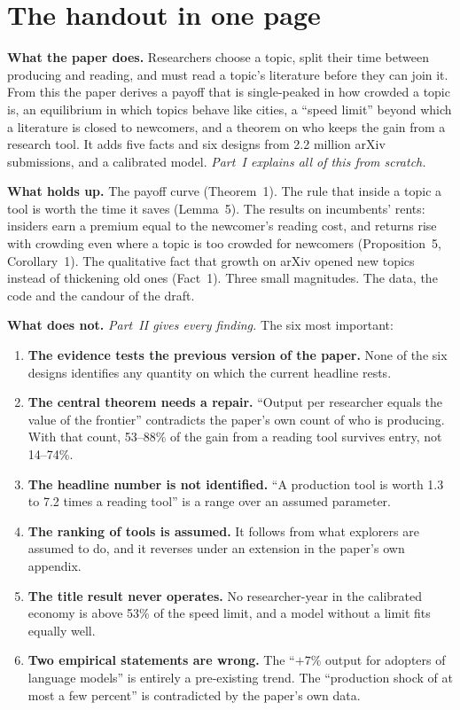 \section*{The handout in one page}

\textbf{What the paper does.} Researchers choose a topic, split their time between producing and reading, and must read a topic's literature before they can join it. From this the paper derives a payoff that is single-peaked in how crowded a topic is, an equilibrium in which topics behave like cities, a ``speed limit'' beyond which a literature is closed to newcomers, and a theorem on who keeps the gain from a research tool. It adds five facts and six designs from 2.2 million arXiv submissions, and a calibrated model. \emph{Part~I explains all of this from scratch.}

\textbf{What holds up.} The payoff curve (Theorem~1). The rule that inside a topic a tool is worth the time it saves (Lemma~5). The results on incumbents' rents: insiders earn a premium equal to the newcomer's reading cost, and returns rise with crowding even where a topic is too crowded for newcomers (Proposition~5, Corollary~1). The qualitative fact that growth on arXiv opened new topics instead of thickening old ones (Fact~1). Three small magnitudes. The data, the code and the candour of the draft.

\textbf{What does not.} \emph{Part~II gives every finding.} The six most important:
\begin{enumerate}[leftmargin=1.7em]
\item \textbf{The evidence tests the previous version of the paper.} None of the six designs identifies any quantity on which the current headline rests.
\item \textbf{The central theorem needs a repair.} ``Output per researcher equals the value of the frontier'' contradicts the paper's own count of who is producing. With that count, 53--88\% of the gain from a reading tool survives entry, not 14--74\%.
\item \textbf{The headline number is not identified.} ``A production tool is worth 1.3 to 7.2 times a reading tool'' is a range over an assumed parameter.
\item \textbf{The ranking of tools is assumed.} It follows from what explorers are assumed to do, and it reverses under an extension in the paper's own appendix.
\item \textbf{The title result never operates.} No researcher-year in the calibrated economy is above 53\% of the speed limit, and a model without a limit fits equally well.
\item \textbf{Two empirical statements are wrong.} The ``$+7\%$ output for adopters of language models'' is entirely a pre-existing trend. The ``production shock of at most a few percent'' is contradicted by the paper's own data.
\end{enumerate}

